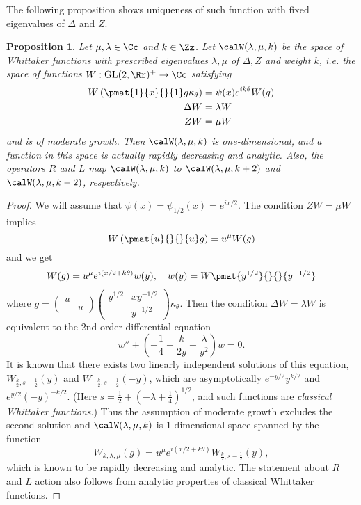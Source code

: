 \documentclass{article}
\newcommand{\GL}{\mathrm{GL}}
\newcommand{\smat}[4]{\left(\begin{smallmatrix} #1 & #2 \\ #3 & #4 \end{smallmatrix}\right)}
\newtheorem{proposition}{Proposition}[section]
\begin{document}
The following proposition shows uniqueness of such function with fixed eigenvalues of $\Delta$ and $Z$. 
\begin{proposition}
Let $\mu, \lambda\in \Cc$ and $k\in \Zz$. Let $\calW(\lambda, \mu, k)$ be the space of Whittaker functions with prescribed eigenvalues $\lambda, \mu$ of $\Delta, Z$  and weight $k$, i.e. the space of functions $W:\GL(2, \Rr)^{+}\to \Cc$ satisfying 
\begin{align*}
W\left( \pmat{1}{x}{}{1}g \kappa_{\theta}\right) &= \psi(x)e^{ik\theta}W(g) \\
\Delta W &= \lambda W \\
ZW &= \mu W
\end{align*}
and is of moderate growth. Then $\calW(\lambda, \mu, k)$ is one-dimensional, and a function in this space is actually rapidly decreasing and analytic. 
Also, the operators $R$ and $L$ map $\calW(\lambda, \mu,k)$ to $\calW(\lambda, \mu, k+2)$ and $\calW(\lambda, \mu, k-2)$, respectively. 
\end{proposition}
\begin{proof}
We will assume that $\psi(x) =\psi_{1/2}(x) = e^{ix/2}$. The condition $ZW = \mu W$ implies 
$$
W\left(\pmat{u}{}{}{u}g\right) = u^{\mu} W(g)
$$
and we get
\begin{align*}
W(g) = u^{\mu} e^{i(x/2+k\theta)}w(y), \quad w(y) = W\pmat{y^{1/2}}{}{}{y^{-1/2}}\end{align*}
where $g = \smat{u}{}{}{u} \smat{y^{1/2}}{xy^{-1/2}}{}{y^{-1/2}} \kappa_{\theta}$. 
Then the condition $\Delta W = \lambda W$ is equivalent to the 2nd order differential equation
$$
w'' + \left(-\frac{1}{4} + \frac{k}{2y} + \frac{\lambda}{y^{2}}\right)w = 0.
$$
It is known that there exists two linearly independent solutions of this equation, $W_{\frac{k}{2}, s-\frac{1}{2}}(y)$ and $W_{-\frac{k}{2}, s-\frac{1}{2}}(-y)$, which are asymptotically $e^{-y/2}y^{k/2}$ and $e^{y/2}(-y)^{-k/2}$.  (Here $s = \frac{1}{2} + (-\lambda + \frac{1}{4})^{1/2}$, and such functions are \emph{classical Whittaker functions}.) 
Thus the assumption of moderate growth excludes the second solution and $\calW(\lambda, \mu, k)$ is 1-dimensional space spanned by the function
$$
W_{k, \lambda, \mu}(g) = u^{\mu}e^{i(x/2 + k\theta)} W_{\frac{k}{2}, s-\frac{1}{2}}(y),
$$
which is known to be rapidly decreasing and analytic. 
The statement about $R$ and $L$ action also follows from analytic properties of classical Whittaker functions. 
\end{proof}
\end{document}
